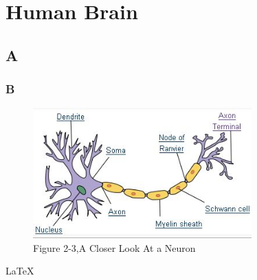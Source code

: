 \documentclass[12pt , a4paper]{article}
\begin{document}
\section { Human Brain } \label{sec:1}
\subsection{A}
\subsubsection{B}


\begin{figure}[h]
\centering
\includegraphics[width=0.75\textwidth,frame]{Neuron.jpg}
\caption*{Figure 2-3,A Closer Look At a Neuron}
\label{f-1-4}
\end{figure}


\LaTeX
\end{document}
